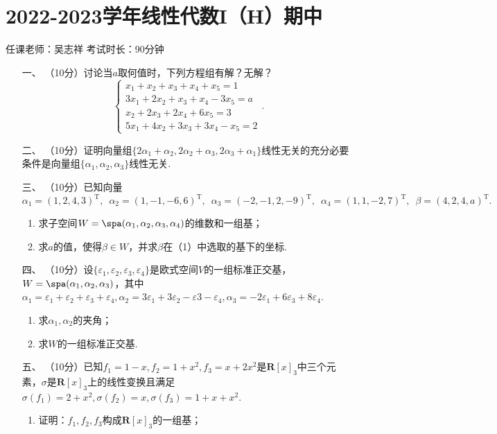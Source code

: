 \section*{2022-2023学年线性代数I（H）期中}

\begin{center}
    任课老师：吴志祥\hspace{4em} 考试时长：90分钟
\end{center}

\begin{enumerate}
	\item[一、]（10分）讨论当$a$取何值时，下列方程组有解？无解？
	\[\begin{cases}
        x_1+x_2+x_3+x_4+x_5=1 \\
        3x_1+2x_2+x_3+x_4-3x_5=a \\
        x_2+2x_3+2x_4+6x_5=3 \\
        5x_1+4x_2+3x_3+3x_4-x_5=2
    \end{cases}.\]
	\item[二、]（10分）证明向量组$\{2\alpha_1+\alpha_2,2\alpha_2+\alpha_3,2\alpha_3+\alpha_1\}$线性无关的充分必要条件是向量组$\{\alpha_1,\alpha_2,\alpha_3\}$线性无关.
	\item[三、]（10分）已知向量$\alpha_1=(1,2,4,3)^\mathrm{T},\enspace \alpha_2=(1,-1,-6,6)^\mathrm{T},\enspace \alpha_3=(-2,-1,2,-9)^\mathrm{T},\enspace \alpha_4=(1,1,-2,7)^\mathrm{T},\enspace \beta=(4,2,4,a)^\mathrm{T}.$
    \begin{enumerate}[label=(\arabic*)]
        \item 求子空间$W=\spa(\alpha_1,\alpha_2,\alpha_3,\alpha_4)$的维数和一组基；
        \item 求$a$的值，使得$\beta\in W$，并求$\beta$在（1）中选取的基下的坐标.
    \end{enumerate}
	\item[四、]（10分）设$\{\varepsilon_1,\varepsilon_2,\varepsilon_3,\varepsilon_4\}$是欧式空间$V$的一组标准正交基，$W=\spa(\alpha_1,\alpha_2,\alpha_3)$，其中$\alpha_1=\varepsilon_1+\varepsilon_2+\varepsilon_3+\varepsilon_4,\alpha_2=3\varepsilon_1+3\varepsilon_2-\varepsilon3-\varepsilon_4,\alpha_3=-2\varepsilon_1+6\varepsilon_3+8\varepsilon_4$.
	\begin{enumerate}[label=(\arabic*)]
        \item 求$\alpha_1,\alpha_2$的夹角；
        \item 求$W$的一组标准正交基.
    \end{enumerate}
	\item[五、]（10分）已知$f_1=1-x,f_2=1+x^2,f_3=x+2x^2$是$\mathbf{R}[x]_3$中三个元素，$\sigma$是$\mathbf{R}[x]_3$上的线性变换且满足$\sigma(f_1)=2+x^2,\sigma(f_2)=x,\sigma(f_3)=1+x+x^2$.
    \begin{enumerate}[label=(\arabic*)]
        \item 证明：$f_1,f_2,f_3$构成$\mathbf{R}[x]_3$的一组基；


\end{enumerate}
\end{enumerate}
